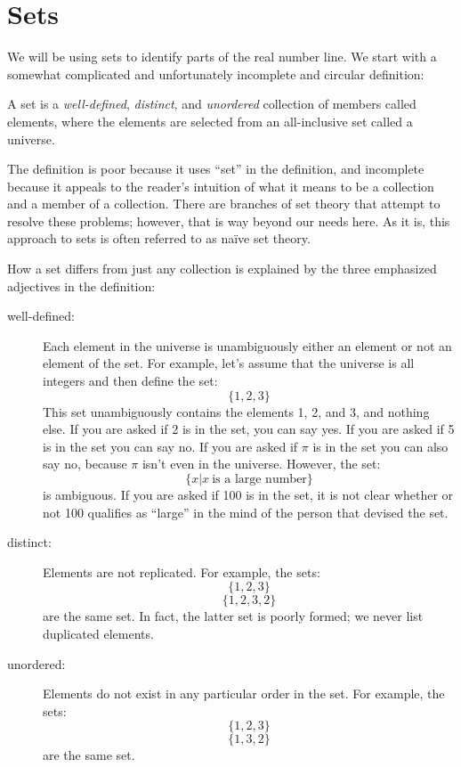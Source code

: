 \documentclass[letterpaper,12pt,fleqn]{article}
\begin{document}
\section*{Sets}

We will be using sets to identify parts of the real number line. We start with a
somewhat complicated and unfortunately incomplete and circular definition:

\begin{definition}[Set]
A set is a \emph{well-defined}, \emph{distinct}, and \emph{unordered}
collection of members called elements, where the elements are selected from
an all-inclusive set called a universe.
\end{definition}

The definition is poor because it uses ``set'' in the definition, and
incomplete because it appeals to the reader's intuition of what it means to be
a collection and a member of a collection. There are branches of set theory
that attempt to resolve these problems; however, that is way beyond our needs
here. As it is, this approach to sets is often referred to as na\"{i}ve set
theory.

How a set differs from just any collection is explained by the three emphasized
adjectives in the definition:

\begin{description}
\item[well-defined:] Each element in the universe is unambiguously either an
element or not an element of the set. For example, let's assume that the
universe is all integers and then define the set:
\[\{1, 2, 3\}\]
This set unambiguously contains the elements 1, 2, and 3, and nothing else. If
you are asked if 2 is in the set, you can say yes. If you are asked if 5 is in
the set you can say no. If you are asked if $\pi$ is in the set you can also
say no, because $\pi$ isn't even in the universe. However, the set:
\[\{x|x\ \mbox{is a large number}\}\]
is ambiguous. If you are asked if 100 is in the set, it is not clear whether or
not 100 qualifies as ``large'' in the mind of the person that devised the set.

\item[distinct:] Elements are not replicated. For example, the sets:
\[\{1, 2, 3\}\]
\[\{1, 2, 3, 2\}\]
are the same set. In fact, the latter set is poorly formed; we never list
duplicated elements.

\item[unordered:] Elements do not exist in any particular order in the set.
For example, the sets:
\[\{1, 2, 3\}\]
\[\{1, 3, 2\}\]
are the same set.
\end{description}
\end{document}
